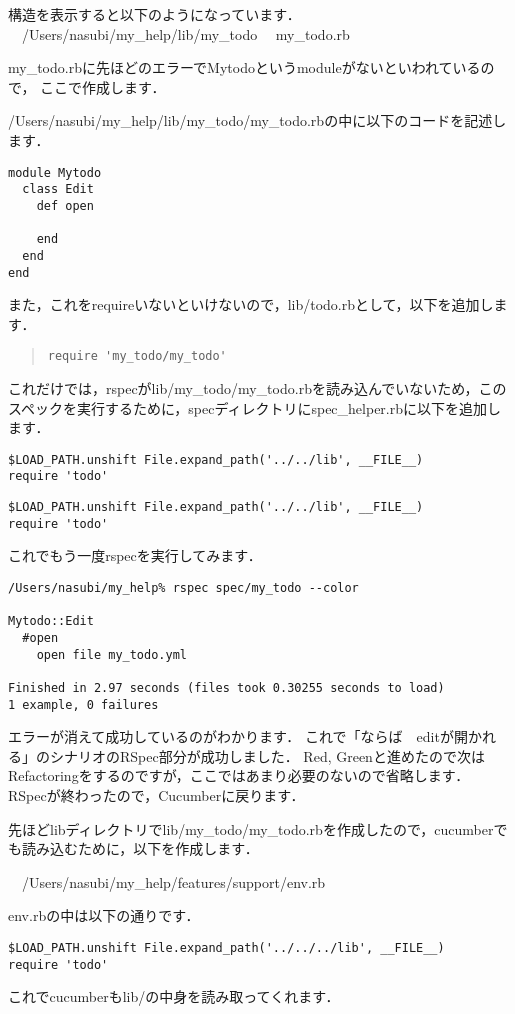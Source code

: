 構造を表示すると以下のようになっています．
　/Users/nasubi/my\_help/lib/my\_todo%
　my\_todo.rb

my\_todo.rbに先ほどのエラーでMytodoというmoduleがないといわれているので，
ここで作成します．

/Users/nasubi/my\_help/lib/my\_todo/my\_todo.rbの中に以下のコードを記述します．
\begin{lstlisting}[style=customCsh]
module Mytodo
  class Edit
    def open

    end
  end
end
\end{lstlisting}
また，これをrequireいないといけないので，lib/todo.rbとして，以下を追加します．
\begin{quote}\begin{verbatim}
require 'my_todo/my_todo'
\end{verbatim}\end{quote}
これだけでは，rspecがlib/my\_todo/my\_todo.rbを読み込んでいないため，このスペックを実行するために，specディレクトリにspec\_helper.rbに以下を追加します．
\begin{lstlisting}[style=customCsh]
$LOAD_PATH.unshift File.expand_path('../../lib', __FILE__)
require 'todo'
\end{lstlisting}\begin{lstlisting}[style=customRuby]
$LOAD_PATH.unshift File.expand_path('../../lib', __FILE__)
require 'todo'
\end{lstlisting}
これでもう一度rspecを実行してみます．
\begin{lstlisting}[style=customCsh]
/Users/nasubi/my_help% rspec spec/my_todo --color

Mytodo::Edit
  #open
    open file my_todo.yml

Finished in 2.97 seconds (files took 0.30255 seconds to load)
1 example, 0 failures

\end{lstlisting}
エラーが消えて成功しているのがわかります．
これで「ならば　editが開かれる」のシナリオのRSpec部分が成功しました．
Red, Greenと進めたので次はRefactoringをするのですが，ここではあまり必要のないので省略します．
RSpecが終わったので，Cucumberに戻ります．

先ほどlibディレクトリでlib/my\_todo/my\_todo.rbを作成したので，cucumberでも読み込むために，以下を作成します．

　/Users/nasubi/my\_help/features/support/env.rb

env.rbの中は以下の通りです．
\begin{lstlisting}[style=customRuby]
$LOAD_PATH.unshift File.expand_path('../../../lib', __FILE__)
require 'todo'
\end{lstlisting}
これでcucumberもlib/の中身を読み取ってくれます．

